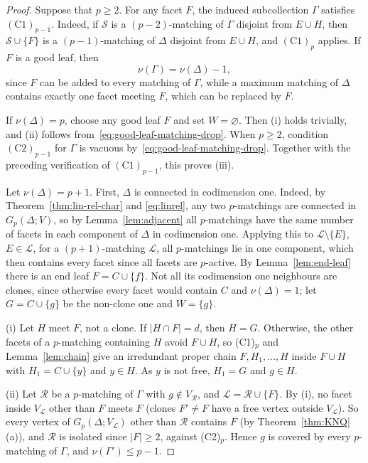 \documentclass{amsart}
\theoremstyle{definition}
\theoremstyle{remark}
\begin{document}
\begin{proof}
Suppose that $p\geq2$. For any facet $F$, the induced subcollection
$\Gamma$ satisfies $(\mathrm C1)_{p-1}$.
Indeed, if $\mathcal S$ is a $(p-2)$-matching of $\Gamma$ disjoint from
$E\cup H$, then $\mathcal S\cup\{F\}$ is a $(p-1)$-matching of
$\Delta$ disjoint from $E\cup H$, and $(\mathrm C1)_p$ applies. If $F$ is a good leaf, then
\begin{equation}\label{eq:good-leaf-matching-drop}
\nu(\Gamma)=\nu(\Delta)-1,
\end{equation}
since $F$ can be added to every matching of $\Gamma$, while a maximum matching of $\Delta$ contains exactly one facet meeting $F$, which can be replaced by $F$.

If $\nu(\Delta)=p$, choose any good leaf $F$ and set $W=\varnothing$.
Then (i) holds trivially, and (ii) follows
from~\eqref{eq:good-leaf-matching-drop}.
When $p\geq2$, condition $(\mathrm C2)_{p-1}$ for $\Gamma$ is vacuous
by~\eqref{eq:good-leaf-matching-drop}. Together with the preceding
verification of $(\mathrm C1)_{p-1}$, this proves (iii).

Let $\nu(\Delta)=p+1$. First, $\Delta$ is connected in codimension one. Indeed, by Theorem~\ref{thm:lin-rel-char} and \eqref{eq:linrel}, any two $p$-matchings are connected in $G_p(\Delta;V)$, so by Lemma~\ref{lem:adjacent} all $p$-matchings have the same number of facets in each component of $\Delta$ in codimension one. Applying this to $\mathcal L\setminus\{E\}$, $E\in\mathcal L$, for a $(p+1)$-matching $\mathcal L$, all $p$-matchings lie in one component, which then contains every facet since all facets are $p$-active. By Lemma~\ref{lem:end-leaf} there is an end leaf $F=C\cup\{f\}$. Not all its codimension one neighbours are clones, since otherwise every facet would contain $C$ and $\nu(\Delta)=1$; let $G=C\cup\{g\}$ be the non-clone one and $W=\{g\}$.

(i) Let $H$ meet $F$, not a clone. If $|H\cap F|=d$, then $H=G$. Otherwise, the other facets of a $p$-matching containing $H$ avoid $F\cup H$, so (C1)$_p$ and Lemma~\ref{lem:chain} give an irredundant proper chain $F,H_1,\ldots,H$ inside $F\cup H$ with $H_1=C\cup\{y\}$ and $y\in H$. As $y$ is not free, $H_1=G$ and $g\in H$.

(ii) Let $\mathcal R$ be a $p$-matching of $\Gamma$ with $g\notin V_{\mathcal R}$, and $\mathcal L=\mathcal R\cup\{F\}$. By (i), no facet inside $V_{\mathcal L}$ other than $F$ meets $F$ (clones $F'\neq F$ have a free vertex outside $V_{\mathcal L}$). So every vertex of $G_p(\Delta;V_{\mathcal L})$ other than $\mathcal R$ contains $F$ (by Theorem~\ref{thm:KNQ}(a)), and $\mathcal R$ is isolated since $|F|\geq 2$, against (C2)$_p$. Hence $g$ is covered by every $p$-matching of $\Gamma$, and $\nu(\Gamma')\leq p-1$.


\end{proof}
\end{document}
